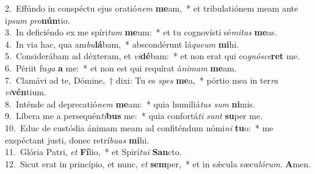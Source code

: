 {2.~}Effúndo in conspéctu ejus oratió\textit{nem} \textbf{me}am,~* et tribulatiónem meam ante i\textit{psum} \textit{pro}\textbf{nún}tio.\\
{3.~}In deficiéndo ex me spíri\textit{tum} \textbf{me}um:~* et tu cognovísti sé\textit{mi}\textit{tas} \textbf{me}as.\\
{4.~}In via hac, qua am\textit{bu}\textbf{lá}bam,~* abscondérunt lá\textit{que}\textit{um} \textbf{mi}hi.\\
{5.~}Considerábam ad déxteram, et \textit{vi}\textbf{dé}bam:~* et non erat qui co\textit{gnó}\textit{sce}\textbf{ret} me.\\
{6.~}Périit fu\textit{ga} \textbf{a} me:~* et non est qui requírat á\textit{ni}\textit{mam} \textbf{me}am.\\
{7.~}Clamávi ad te, Dómine,~† dixi: Tu es \textit{spes} \textbf{me}a,~* pórtio mea in ter\textit{ra} \textit{vi}\textbf{vén}tium.\\
{8.~}Inténde ad deprecatió\textit{nem} \textbf{me}am:~* quia humiliá\textit{tus} \textit{sum} \textbf{ni}mis.\\
{9.~}Líbera me a persequén\textit{ti}\textbf{bus} me:~* quia confortá\textit{ti} \textit{sunt} \textbf{su}per me.\\
{10.~}Educ de custódia ánimam meam ad confiténdum nómi\textit{ni} \textbf{tu}o:~* me exspéctant justi, donec retrí\textit{bu}\textit{as} \textbf{mi}hi.\\
{11.~}Glória Patri, \textit{et} \textbf{Fí}lio,~* et Spirí\textit{tu}\textit{i} \textbf{San}cto.\\
{12.~}Sicut erat in princípio, et nunc, \textit{et} \textbf{sem}per,~* et in sǽcula sæcu\textit{ló}\textit{rum}. \textbf{A}men.\\
